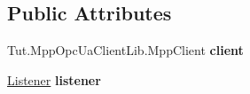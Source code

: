 \subsection*{Public Attributes}
\begin{DoxyCompactItemize}
\item 
\mbox{\label{class_a_s_e6030_1_1_controller_a36785106c3f4bc54402290b0d86911fc}} 
Tut.\+Mpp\+Opc\+Ua\+Client\+Lib.\+Mpp\+Client {\bfseries client}
\item 
\mbox{\label{class_a_s_e6030_1_1_controller_a8cc31711b16a81099afb9ad6125d1d0f}} 
\hyperlink{class_a_s_e6030_1_1_listener}{Listener} {\bfseries listener}
\end{DoxyCompactItemize}
